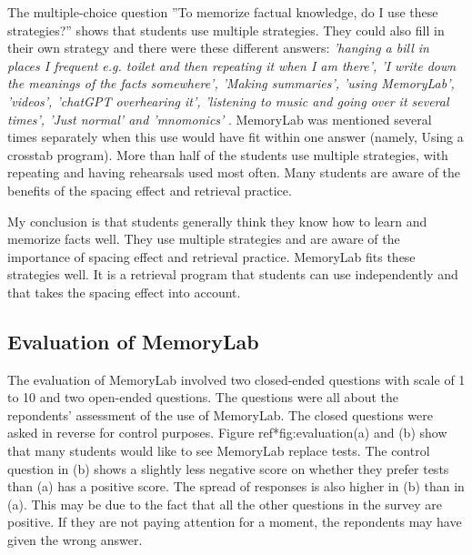 \documentclass[12pt, a4paper]{article}
\begin{document}
{{The multiple-choice question ''To memorize factual knowledge, do I use these strategies?'' shows that students use multiple strategies. They could also fill in their own strategy and there were these different answers:
\emph{
'hanging a bill in places I frequent e.g. toilet and then repeating it when I am there', 'I write down the meanings of the facts somewhere', 'Making summaries', 'using MemoryLab', 'videos', 'chatGPT overhearing it', 'listening to music and going over it several times', 'Just normal' and 'mnomonics' }.
MemoryLab was mentioned several times separately when this use would have fit within one answer (namely, Using a crosstab program). More than half of the students use multiple strategies, with repeating and having rehearsals used most often. Many students are aware of the benefits of the spacing effect and retrieval practice.

My conclusion is that students generally think they know how to learn and memorize facts well. They use multiple strategies and are aware of the importance of spacing effect and retrieval practice. MemoryLab fits these strategies well. It is a retrieval program that students can use independently and that takes the spacing effect into account.

\subsection[Evaluation]{Evaluation of MemoryLab}
The evaluation of MemoryLab involved two closed-ended questions with scale of 1 to 10 and two open-ended questions. The questions were all about the repondents' assessment of the use of MemoryLab. The closed questions were asked in reverse for control purposes.
Figure ref*{fig:evaluation}(a) and (b) show that many students would like to see MemoryLab replace tests. The control question in (b) shows a slightly less negative score on whether they prefer tests than (a) has a positive score. The spread of responses is also higher in (b) than in (a). This may be due to the fact that all the other questions in the survey are positive. If they are not paying attention for a moment, the repondents may have given the wrong answer.

}}
\end{document}
